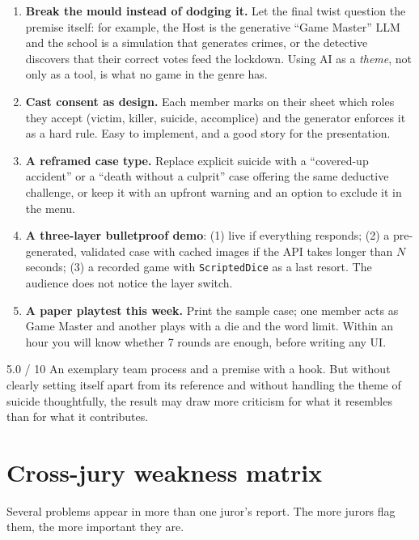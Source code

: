 \documentclass[11pt,a4paper]{article}
\begin{document}
\begin{inedito}
\begin{enumerate}
\item \textbf{Break the mould instead of dodging it.} Let the final twist question the premise
itself: for example, the Host is the generative ``Game Master'' LLM and the school is a simulation
that generates crimes, or the detective discovers that their correct votes feed the lockdown. Using
AI as a \emph{theme}, not only as a tool, is what no game in the genre has.
\item \textbf{Cast consent as design.} Each member marks on their sheet which roles they accept
(victim, killer, suicide, accomplice) and the generator enforces it as a hard rule. Easy to implement,
and a good story for the presentation.
\item \textbf{A reframed case type.} Replace explicit suicide with a ``covered-up accident'' or a
``death without a culprit'' case offering the same deductive challenge, or keep it with an upfront
warning and an option to exclude it in the menu.
\item \textbf{A three-layer bulletproof demo}: (1) live if everything responds; (2) a pre-generated,
validated case with cached images if the API takes longer than $N$ seconds; (3) a recorded game with
\texttt{ScriptedDice} as a last resort. The audience does not notice the layer switch.
\item \textbf{A paper playtest this week.} Print the sample case; one member acts as Game Master and
another plays with a die and the word limit. Within an hour you will know whether 7 rounds are
enough, before writing any UI.
\end{enumerate}
\end{inedito}

\begin{veredicto}{5.0 / 10}
An exemplary team process and a premise with a hook. But without clearly setting itself apart from its
reference and without handling the theme of suicide thoughtfully, the result may draw more criticism
for what it resembles than for what it contributes.
\end{veredicto}

\section{Cross-jury weakness matrix}\label{sec:matrix}

Several problems appear in more than one juror's report. The more jurors flag them, the more
important they are.
\end{document}
